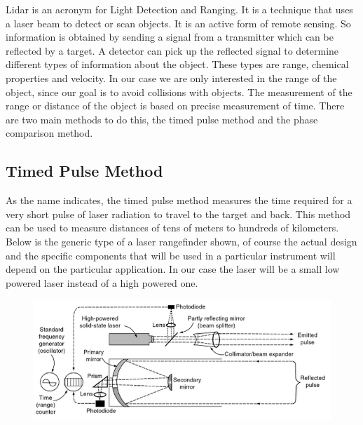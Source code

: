 \documentclass{article}
\begin{document}
Lidar is an acronym for Light Detection and Ranging. It is a technique that uses a laser beam to detect or scan objects. It is an active form of remote sensing. So information is obtained by sending a signal from a transmitter which can be reflected by a target. A detector can pick up the reflected signal to determine different types of information about the object. These types are range, chemical properties and velocity.
In our case we are only interested in the range of the object, since our goal is to avoid collisions with objects. The measurement of the range or distance of the object is based on precise measurement of time. There are two main methods to do this, the timed pulse method and the phase comparison method.


\subsection{Timed Pulse Method}

As the name indicates, the timed pulse method measures the time required for a very short pulse of laser radiation to travel to the target and back. This method can be used to measure distances of tens of meters to hundreds of kilometers. Below is the generic type of a laser rangefinder shown, of course the actual design and the specific components that will be used in a particular instrument will depend on the particular application. In our case the laser will be a small low powered laser instead of a high powered one.

\begin{figure}[H]
	\centering
	\includegraphics[scale=0.8]{figures/TimedPulse}
	\caption{ }
	\label{lidar1}
\end{figure}
\end{document}
